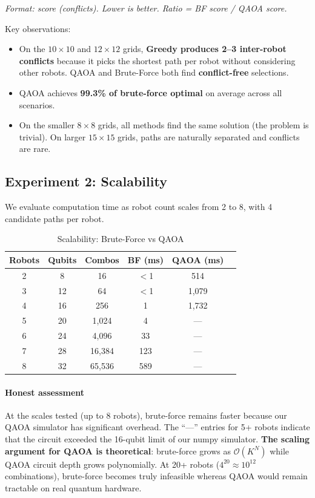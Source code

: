 \documentclass[conference]{IEEEtran}
\begin{document}
\noindent \textit{Format: score (conflicts). Lower is better. Ratio = BF score / QAOA score.}

Key observations:
\begin{itemize}
    \item On the $10\times10$ and $12\times12$ grids, \textbf{Greedy produces 2--3 inter-robot conflicts} because it picks the shortest path per robot without considering other robots. QAOA and Brute-Force both find \textbf{conflict-free} selections.
    \item QAOA achieves \textbf{99.3\% of brute-force optimal} on average across all scenarios.
    \item On the smaller $8\times8$ grids, all methods find the same solution (the problem is trivial). On larger $15\times15$ grids, paths are naturally separated and conflicts are rare.
\end{itemize}

\subsection{Experiment 2: Scalability}

We evaluate computation time as robot count scales from 2 to 8, with 4 candidate paths per robot.

\begin{table}[h]
\centering
\caption{Scalability: Brute-Force vs QAOA}
\label{tab:exp2}
\begin{tabular}{@{}cccccc@{}}
\toprule
\textbf{Robots} & \textbf{Qubits} & \textbf{Combos} & \textbf{BF (ms)} & \textbf{QAOA (ms)} \\
\midrule
2 & 8 & 16 & $<$1 & 514 \\
3 & 12 & 64 & $<$1 & 1,079 \\
4 & 16 & 256 & 1 & 1,732 \\
5 & 20 & 1,024 & 4 & --- \\
6 & 24 & 4,096 & 33 & --- \\
7 & 28 & 16,384 & 123 & --- \\
8 & 32 & 65,536 & 589 & --- \\
\bottomrule
\end{tabular}
\end{table}

\paragraph{Honest assessment} At the scales tested (up to 8 robots), brute-force remains faster because our QAOA simulator has significant overhead. The ``---'' entries for 5+ robots indicate that the circuit exceeded the 16-qubit limit of our numpy simulator. \textbf{The scaling argument for QAOA is theoretical}: brute-force grows as $\mathcal{O}(K^N)$ while QAOA circuit depth grows polynomially. At 20+ robots ($4^{20} \approx 10^{12}$ combinations), brute-force becomes truly infeasible whereas QAOA would remain tractable on real quantum hardware.
\end{document}
